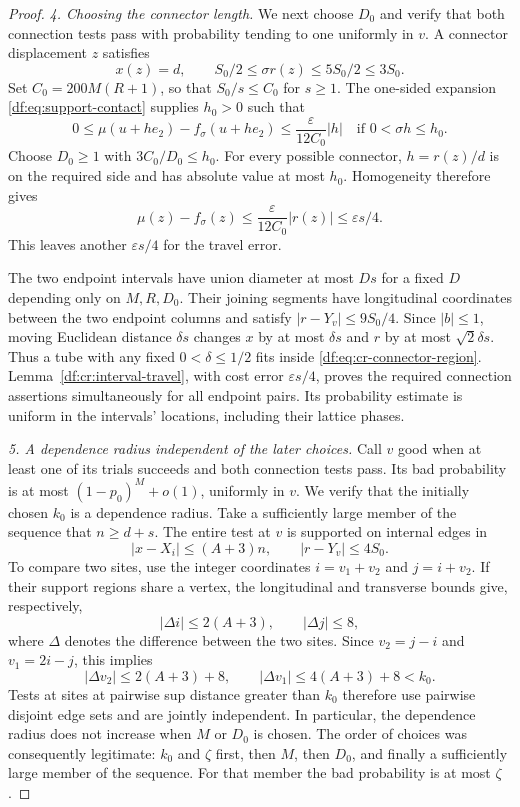 \begin{proof}
\emph{4. Choosing the connector length.}
We next choose $D_0$ and verify that both connection tests pass with
probability tending to one uniformly in $v$. A connector displacement
$z$ satisfies
\[
 x(z)=d,
 \qquad S_0/2\le\sigma r(z)\le5S_0/2\le3S_0.
\]
Set $C_0=200M(R+1)$, so that $S_0/s\le C_0$ for $s\ge1$.
The one-sided expansion \eqref{df:eq:support-contact} supplies $h_0>0$
such that
\[
 0\le\mu(u+h e_2)-f_\sigma(u+h e_2)
       \le\frac{\varepsilon}{12C_0}|h|
 \quad\text{if }0<\sigma h\le h_0.
\]
Choose $D_0\ge1$ with $3C_0/D_0\le h_0$. For every possible connector,
$h=r(z)/d$ is on the required side and has absolute value at most $h_0$.
Homogeneity therefore gives
\[
 \mu(z)-f_\sigma(z)
   \le\frac{\varepsilon}{12C_0}|r(z)|\le\varepsilon s/4.
\]
This leaves another $\varepsilon s/4$ for the travel error.

The two endpoint intervals have union diameter at most $Ds$ for a fixed
$D$ depending only on $M,R,D_0$. Their joining segments have longitudinal
coordinates between the two endpoint columns and satisfy
$|r-Y_v|\le9S_0/4$. Since $|b|\le1$, moving Euclidean distance
$\delta s$ changes $x$ by at most $\delta s$ and $r$ by at most
$\sqrt2\delta s$. Thus a tube with any fixed $0<\delta\le1/2$ fits
inside \eqref{df:eq:cr-connector-region}. Lemma~\ref{df:cr:interval-travel},
with cost error $\varepsilon s/4$, proves the required connection assertions
simultaneously for all endpoint pairs. Its probability estimate is
uniform in the intervals' locations, including their lattice phases.

\emph{5. A dependence radius independent of the later choices.}
Call $v$ good when at least one of its trials succeeds and both connection
tests pass. Its bad probability is at most
$(1-p_0)^M+o(1)$, uniformly in $v$. We verify that the initially chosen
$k_0$ is a dependence radius. Take a sufficiently large member of the
sequence that $n\ge d+s$. The entire test at $v$ is supported on internal
edges in
\[
 |x-X_i|\le(A+3)n,
 \qquad |r-Y_v|\le4S_0.
\]
To compare two sites, use the integer coordinates $i=v_1+v_2$ and
$j=i+v_2$. If their support regions share a vertex, the longitudinal
and transverse bounds give, respectively,
\[
 |\Delta i|\le2(A+3),
 \qquad |\Delta j|\le8,
\]
where $\Delta$ denotes the difference between the two sites.
Since $v_2=j-i$ and $v_1=2i-j$, this implies
\[
 |\Delta v_2|\le2(A+3)+8,
 \qquad |\Delta v_1|\le4(A+3)+8<k_0.
\]
Tests at sites at pairwise sup distance greater than $k_0$ therefore use
pairwise disjoint edge sets and are jointly independent. In particular,
the dependence radius does not increase when $M$ or $D_0$ is chosen.
The order of choices was consequently legitimate: $k_0$ and $\zeta$
first, then $M$, then $D_0$, and finally a sufficiently large member of
the sequence. For that member the bad probability is at most $\zeta$.


\end{proof}
